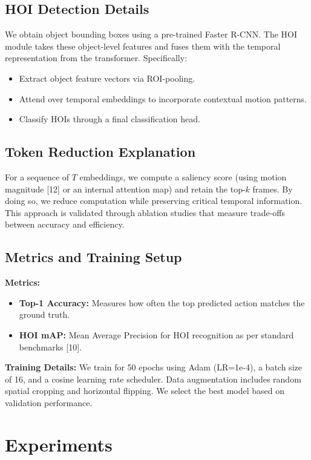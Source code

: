 \documentclass{article}
\begin{document}
\subsection{HOI Detection Details}
We obtain object bounding boxes using a pre-trained Faster R-CNN. The HOI module takes these object-level features and fuses them with the temporal representation from the transformer. Specifically:
\begin{itemize}
    \item Extract object feature vectors via ROI-pooling.
    \item Attend over temporal embeddings to incorporate contextual motion patterns.
    \item Classify HOIs through a final classification head.
\end{itemize}

\subsection{Token Reduction Explanation}
For a sequence of $T$ embeddings, we compute a saliency score (using motion magnitude [12] or an internal attention map) and retain the top-$k$ frames. By doing so, we reduce computation while preserving critical temporal information. This approach is validated through ablation studies that measure trade-offs between accuracy and efficiency.

\subsection{Metrics and Training Setup}
\textbf{Metrics:}
\begin{itemize}
    \item \textbf{Top-1 Accuracy:} Measures how often the top predicted action matches the ground truth.
    \item \textbf{HOI mAP:} Mean Average Precision for HOI recognition as per standard benchmarks [10].
\end{itemize}

\textbf{Training Details:}  
We train for 50 epochs using Adam (LR=1e-4), a batch size of 16, and a cosine learning rate scheduler. Data augmentation includes random spatial cropping and horizontal flipping. We select the best model based on validation performance.

\section{Experiments}
\end{document}
